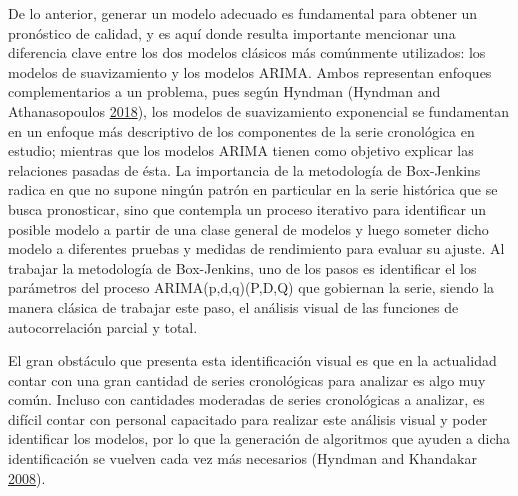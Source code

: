 \documentclass[]{article}
\begin{document}
De lo anterior, generar un modelo adecuado es fundamental para obtener
un pronóstico de calidad, y es aquí donde resulta importante mencionar
una diferencia clave entre los dos modelos clásicos más comúnmente
utilizados: los modelos de suavizamiento y los modelos ARIMA. Ambos
representan enfoques complementarios a un problema, pues según Hyndman
(Hyndman and Athanasopoulos
\protect\hyperlink{ref-hyndman2018forecasting}{2018}), los modelos de
suavizamiento exponencial se fundamentan en un enfoque más descriptivo
de los componentes de la serie cronológica en estudio; mientras que los
modelos ARIMA tienen como objetivo explicar las relaciones pasadas de
ésta. La importancia de la metodología de Box-Jenkins radica en que no
supone ningún patrón en particular en la serie histórica que se busca
pronosticar, sino que contempla un proceso iterativo para identificar un
posible modelo a partir de una clase general de modelos y luego someter
dicho modelo a diferentes pruebas y medidas de rendimiento para evaluar
su ajuste. Al trabajar la metodología de Box-Jenkins, uno de los pasos
es identificar el los parámetros del proceso ARIMA(p,d,q)(P,D,Q) que
gobiernan la serie, siendo la manera clásica de trabajar este paso, el
análisis visual de las funciones de autocorrelación parcial y total.

El gran obstáculo que presenta esta identificación visual es que en la
actualidad contar con una gran cantidad de series cronológicas para
analizar es algo muy común. Incluso con cantidades moderadas de series
cronológicas a analizar, es difícil contar con personal capacitado para
realizar este análisis visual y poder identificar los modelos, por lo
que la generación de algoritmos que ayuden a dicha identificación se
vuelven cada vez más necesarios (Hyndman and Khandakar
\protect\hyperlink{ref-auto.arima}{2008}).
\end{document}
